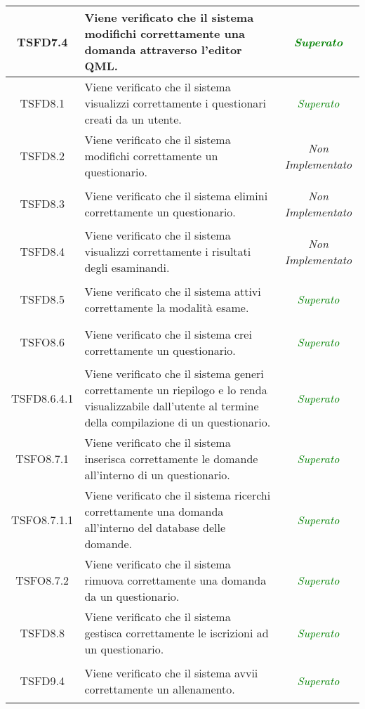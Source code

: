 \begin{longtable}{|c|>{}m{8cm}|c|}
\hypertarget{TSFD7.4}{TSFD7.4} & Viene verificato che il sistema modifichi correttamente una domanda attraverso l’editor QML. & \textcolor{Green}{\textit{Superato}}\\ \hline
\hypertarget{TSFD8.1}{TSFD8.1} & Viene verificato che il sistema visualizzi correttamente i questionari creati da un utente. & \textcolor{Green}{\textit{Superato}}\\ \hline
\hypertarget{TSFD8.2}{TSFD8.2} & Viene verificato che il sistema modifichi correttamente un questionario. & \textit{Non Implementato}\\ \hline
\hypertarget{TSFD8.3}{TSFD8.3} & Viene verificato che il sistema elimini correttamente un questionario. & \textit{Non Implementato}\\ \hline
\hypertarget{TSFD8.4}{TSFD8.4} & Viene verificato che il sistema visualizzi correttamente i risultati degli esaminandi. & \textit{Non Implementato}\\ \hline
\hypertarget{TSFD8.5}{TSFD8.5} & Viene verificato che il sistema attivi correttamente la modalità esame. & \textcolor{Green}{\textit{Superato}}\\ \hline
\hypertarget{TSFO8.6}{TSFO8.6} & Viene verificato che il sistema crei correttamente un questionario. & \textcolor{Green}{\textit{Superato}}\\ \hline
\hypertarget{TSFD8.6.4.1}{TSFD8.6.4.1} & Viene verificato che il sistema generi correttamente un riepilogo e lo renda visualizzabile dall’utente al termine della compilazione di un questionario. & \textcolor{Green}{\textit{Superato}}\\ \hline
\hypertarget{TSFO8.7.1}{TSFO8.7.1} & Viene verificato che il sistema inserisca correttamente le domande all’interno di un questionario. & \textcolor{Green}{\textit{Superato}}\\ \hline
\hypertarget{TSFO8.7.1.1}{TSFO8.7.1.1} & Viene verificato che il sistema ricerchi correttamente una domanda all'interno del database delle domande. & \textcolor{Green}{\textit{Superato}}\\ \hline
\hypertarget{TSFO8.7.2}{TSFO8.7.2} & Viene verificato che il sistema rimuova correttamente una domanda da un questionario. & \textcolor{Green}{\textit{Superato}}\\ \hline
\hypertarget{TSFD8.8}{TSFD8.8} & Viene verificato che il sistema gestisca correttamente le iscrizioni ad un questionario. & \textcolor{Green}{\textit{Superato}}\\ \hline
\hypertarget{TSFD9.4}{TSFD9.4} & Viene verificato che il sistema avvii correttamente un allenamento. & \textcolor{Green}{\textit{Superato}}\\ \hline

\end{longtable}

